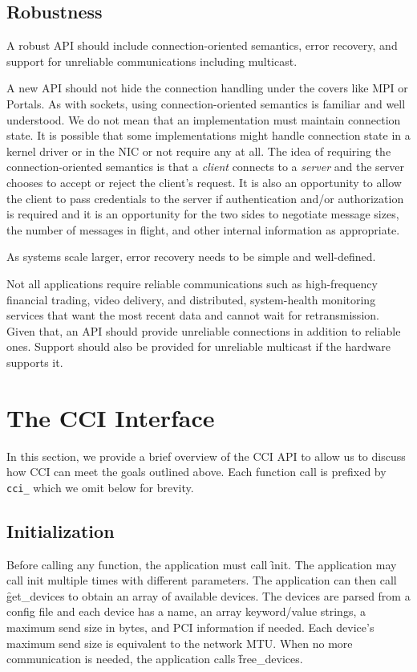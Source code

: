 \documentclass[conference]{IEEEtran}
\begin{document}
\subsection{Robustness}
A robust API should include connection-oriented semantics, error recovery, and support for
unreliable communications including multicast.

A new API should not hide the connection handling under the covers like MPI or Portals.
As with sockets, using connection-oriented semantics is familiar and well understood. We
do not mean that an implementation must maintain connection state. It is possible that
some implementations might handle connection state in a kernel driver or in the NIC or not
require any at all. The idea of requiring the connection-oriented semantics is that a
\emph{client} connects to a \emph{server} and the server chooses to accept or reject the
client's request. It is also an opportunity to allow the client to pass credentials to the
server if authentication and/or authorization is required and it is an opportunity for the
two sides to negotiate message sizes, the number of messages in flight, and other internal
information as appropriate.

As systems scale larger, error recovery needs to be simple and well-defined.

Not all applications require reliable communications such as high-frequency financial
trading, video delivery, and distributed, system-health monitoring services that want the
most recent data and cannot wait for retransmission. Given that, an API should provide
unreliable connections in addition to reliable ones. Support should also be provided for
unreliable multicast if the hardware supports it.

\section{The CCI Interface}
In this section, we provide a brief overview of the CCI API to allow us to discuss how CCI
can meet the goals outlined above. Each function call is prefixed by \texttt{cci\_} which
we omit below for brevity.

\subsection{Initialization}
Before calling any function, the application must call \f{init}. The application
may call init multiple times with different parameters. The application can then call
\f{get\_devices} to obtain an array of available devices. The devices are parsed
from a config file and each device has a name, an array keyword/value strings, a maximum
send size in bytes, and PCI information if needed. Each device's maximum send size is
equivalent to the network MTU. When no more communication is needed, the application calls
\f{free\_devices}.
\end{document}
